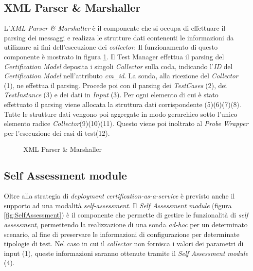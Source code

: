 \documentclass[../main.tex]{subfiles}
\begin{document}
\subsection {XML Parser \& Marshaller}
L'\textit{XML Parser \& Marshaller} è il componente che si occupa di effettuare il parsing dei messaggi e realizza le strutture dati contenenti le informazioni da utilizzare ai fini dell'esecuzione dei \textit{collector}.
Il funzionamento di questo componente è mostrato in figura \ref{fig:XMLParser}.
Il Test Manager effettua il parsing del \textit{Certification Model}\cite{CumulusBigDoc} deposita i singoli \textit{Collector} sulla coda, indicando l'\textit{ID} del \textit{Certification Model} nell'attributo \textit{cm\_id}. La sonda, alla ricezione del \textit{Collector} (1), ne effettua il parsing. Procede poi con il parsing dei \textit{TestCases} (2), dei \textit{TestInstance}\cite{CumulusBigDoc} (3) e dei dati in \textit{Input} (3).
Per ogni elemento di cui è stato effettuato il parsing viene allocata la struttura dati corrispondente (5)(6)(7)(8).
Tutte le strutture dati vengono poi aggregate in modo gerarchico sotto l'unico elemento radice \textit{Collector}(9)(10)(11).
Questo viene poi inoltrato al \textit{Probe Wrapper} per l'esecuzione dei casi di test(12).
\begin{figure}[H]
\centering
{}
\caption{XML Parser \& Marshaller}\label{fig:XMLParser}
\end{figure}

\newpage
\subsection {Self Assessment module}
Oltre alla strategia di \textit{deployment} \textit{certification-as-a-service} è previsto anche il supporto ad una modalità \textit{self-assessment}.
Il \textit{Self Assessment module} (figura \ref{fig:SelfAssessment}) è il componente che permette di gestire le funzionalità di \textit{self assessment}, permettendo la realizzazione di una sonda \textit{ad-hoc} per un determinato scenario, al fine di preservare le informazioni di configurazione per determinate tipologie di test.
Nel caso in cui il \textit{collector} non fornisca i valori dei parametri di input (1), queste informazioni saranno ottenute tramite il \textit{Self Assessment module} (4).
\end{document}
